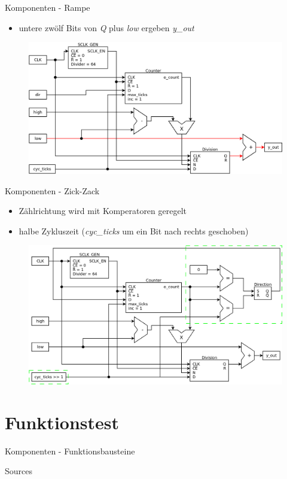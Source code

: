 \documentclass[11pt]{beamer}
\begin{document}
\begin{frame}{Komponenten - Rampe}
  \begin{itemize}
    \item untere zwölf Bits von \emph{Q} plus \emph{low} ergeben \emph{y\_out}
  \end{itemize}
  \begin{figure}
    \includegraphics[scale=0.28]{ramp_step3}
  \end{figure}
\end{frame}

\begin{frame}{Komponenten - Zick-Zack}
  \begin{itemize}
    \item Zählrichtung wird mit Komperatoren geregelt
    \item halbe Zykluszeit (\emph{cyc\_ticks} um ein Bit nach rechts geschoben)
  \end{itemize}
  \begin{figure}
    \includegraphics[scale=0.28]{zigzag}
  \end{figure}
\end{frame}


\section{Funktionstest}
\begin{frame}{Komponenten - Funktionsbausteine}
  
\end{frame}
\begin{frame}{Sources}
 
\printbibliography[title={Sources},heading=bibintoc]
\end{frame}
\end{document}
